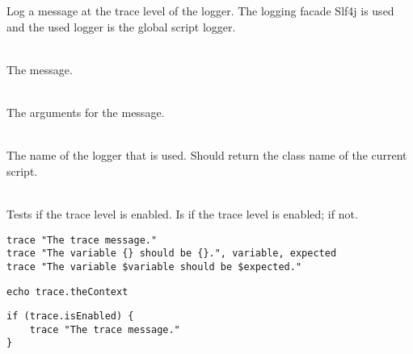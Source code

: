 %


Log a message at the trace level of the logger.
The logging facade Slf4j\cite{slf4j13} is used and the used logger is
the global script logger.

\begin{asparadesc}
%
\item[\code{message}] \hfill \\
The message.
%
\item[\code{args}] \hfill \\
The arguments for the message.
%
\item[\code{theContext}] \hfill \\
The name of the logger that is used. Should return the class name of the current
script.
%
\item[\code{isEnabled}] \hfill \\
Tests if the trace level is enabled. Is  if the trace level is enabled;
 if not.
%
\end{asparadesc}

\begin{lstlisting}[style=Groovybash, label={lst:example_trace1}, title={%
Outputs a trace logging message with arguments.}]
trace "The trace message."
trace "The variable {} should be {}.", variable, expected
trace "The variable $variable should be $expected."
\end{lstlisting}

\begin{lstlisting}[style=Groovybash, label={lst:example_trace2}, title={%
Prints the name of the current logger.}]
echo trace.theContext
\end{lstlisting}

\begin{lstlisting}[style=Groovybash, label={lst:example_trace3}, title={%
Tests if the trace level is enabled.}]
if (trace.isEnabled) {
    trace "The trace message."
}
\end{lstlisting}

